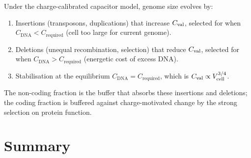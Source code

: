 \begin{proposition}
\label{prop:genome_evolution}
Under the charge-calibrated capacitor model, genome size evolves by:
\begin{enumerate}[label=(\roman*)]
  \item Insertions (transposons, duplications) that increase $C_{\mathrm{val}}$,
    selected for when $C_{\mathrm{DNA}} < C_{\mathrm{required}}$ (cell too large for current genome).
  \item Deletions (unequal recombination, selection) that reduce $C_{\mathrm{val}}$,
    selected for when $C_{\mathrm{DNA}} > C_{\mathrm{required}}$ (energetic cost of excess DNA).
  \item Stabilisation at the equilibrium $C_{\mathrm{DNA}} = C_{\mathrm{required}}$, which
    is $C_{\mathrm{val}} \propto V_{\mathrm{cell}}^{3/4}$.
\end{enumerate}
The non-coding fraction is the buffer that absorbs these insertions and
deletions; the coding fraction is buffered against charge-motivated change
by the strong selection on protein function.
\end{proposition}

\section{Summary}
\label{sec:ch16_summary}

